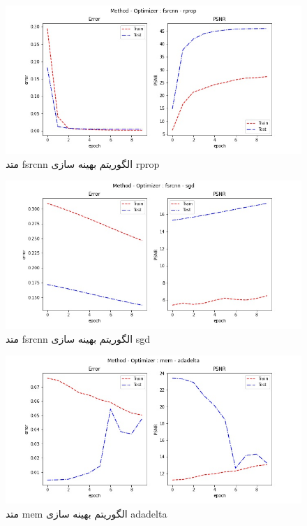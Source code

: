  \begin{figure}[!h] 
       \centering 
       \includegraphics[width=160mm]{./chapter3/images/error-psnr-fsrcnn-rprop.jpg}
       \caption{متد fsrcnn الگوریتم بهینه سازی rprop}
       \label{fig:error-psnr-fsrcnn-rprop}
 \end{figure}
 \begin{figure}[!h] 
       \centering 
       \includegraphics[width=160mm]{./chapter3/images/error-psnr-fsrcnn-sgd.jpg}
       \caption{متد fsrcnn الگوریتم بهینه سازی sgd}
       \label{fig:error-psnr-fsrcnn-sgd}
 \end{figure}
 \begin{figure}[!h] 
       \centering 
       \includegraphics[width=160mm]{./chapter3/images/error-psnr-mem-adadelta.jpg}
       \caption{متد mem الگوریتم بهینه سازی adadelta}
       \label{fig:error-psnr-mem-adadelta}
 \end{figure}
